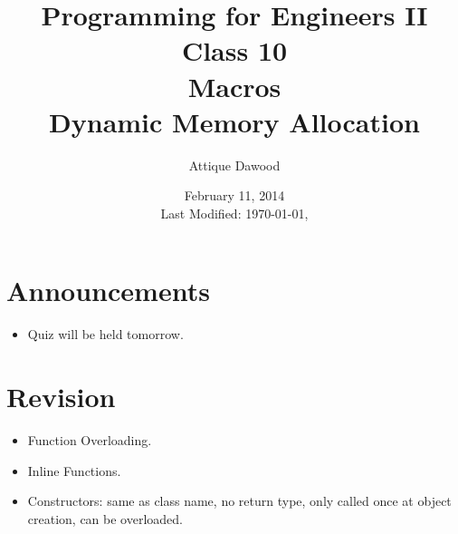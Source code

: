 \documentclass[12pt,a4paper]{article}
\title{\vspace{-2cm}Programming for Engineers II\\Class 10\\Macros\\Dynamic Memory Allocation}
\author{Attique Dawood}
\date{February 11, 2014\\[0.2cm] Last Modified: \today, \currenttime}
\begin{document}
\maketitle
\section{Announcements}
\begin{itemize}
\item Quiz will be held tomorrow.
\end{itemize}
\section{Revision}
\begin{itemize}
\item Function Overloading.
\item Inline Functions.
\item Constructors: same as class name, no return type, only called once at object creation, can be overloaded.
\end{itemize}
\end{document}
